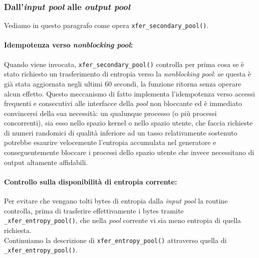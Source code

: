 \documentclass{article}
\begin{document}
 
 \subsubsection{Dall'\emph{input pool} alle \emph{output
 pool}}\label{trasf_input_output}
 Vediamo in questo paragrafo come opera \verb+xfer_secondary_pool()+.
 
 \paragraph{Idempotenza verso \emph{nonblocking pool}:}Quando viene invocata,
 \verb+xfer_secondary_pool()+ controlla per prima cosa se è stato richiesto un
 trasferimento di entropia verso la \emph{nonblocking pool}: se questa è già
 stata aggiornata negli ultimi 60 secondi, la funzione ritorna senza operare
 alcun effetto. Questo meccanismo di fatto implementa l'idempotenza verso
 accessi frequenti e consecutivi alle interfacce della \emph{pool} non
 bloccante ed è immediato convincersi della sua necessità: un qualunque processo
 (o più processi concorrenti), sia esso nello spazio
 kernel o nello spazio utente, che faccia richieste di numeri randomici di
 qualità inferiore ad un tasso relativamente sostenuto potrebbe esaurire
 velocemente l'entropia accumulata nel generatore e conseguentemente bloccare i
 processi dello spazio utente che invece necessitano di output altamente
 affidabili. 
 
 \paragraph{Controllo sulla disponibilità di entropia corrente:} Per evitare
 che vengano tolti bytes di entropia dalla \emph{input pool} la routine
 controlla, prima di trasferire effettivamente i bytes tramite
 \verb+_xfer_entropy_pool()+, che nella \emph{pool} corrente vi sia meno
 entropia di quella richiesta. \\Continuiamo la descrizione di
 \verb+xfer_entropy_pool()+ attraverso quella di \verb+_xfer_entropy_pool()+.
 
\end{document}
